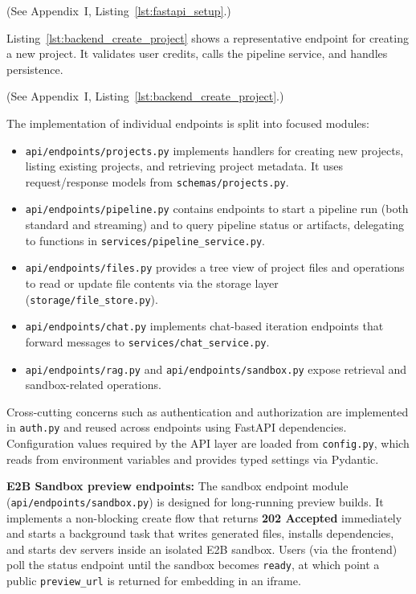 (See Appendix~I, Listing~\ref{lst:fastapi_setup}.)

Listing~\ref{lst:backend_create_project} shows a representative endpoint for creating a new project. It validates user credits, calls the pipeline service, and handles persistence.

(See Appendix~I, Listing~\ref{lst:backend_create_project}.)

The implementation of individual endpoints is split into focused modules:
\begin{itemize}
    \item \texttt{api/\allowbreak{}endpoints/\allowbreak{}projects.py} implements handlers for creating new projects, listing existing projects, and retrieving project metadata. It uses request/response models from \texttt{schemas/\allowbreak{}projects.py}.
    \item \texttt{api/\allowbreak{}endpoints/\allowbreak{}pipeline.py} contains endpoints to start a pipeline run (both standard and streaming) and to query pipeline status or artifacts, delegating to functions in \texttt{services/\allowbreak{}pipeline\_\allowbreak{}service.py}.
    \item \texttt{api/\allowbreak{}endpoints/\allowbreak{}files.py} provides a tree view of project files and operations to read or update file contents via the storage layer (\texttt{storage/\allowbreak{}file\_\allowbreak{}store.py}).
    \item \texttt{api/\allowbreak{}endpoints/\allowbreak{}chat.py} implements chat-based iteration endpoints that forward messages to \texttt{services/\allowbreak{}chat\_\allowbreak{}service.py}.
    \item \texttt{api/\allowbreak{}endpoints/\allowbreak{}rag.py} and \texttt{api/\allowbreak{}endpoints/\allowbreak{}sandbox.py} expose retrieval and sandbox-related operations.
\end{itemize}

Cross-cutting concerns such as authentication and authorization are implemented in \texttt{auth.py} and reused across endpoints using FastAPI dependencies. Configuration values required by the API layer are loaded from \texttt{config.py}, which reads from environment variables and provides typed settings via Pydantic.

\textbf{E2B Sandbox preview endpoints:} The sandbox endpoint module (\texttt{api/\allowbreak{}endpoints/\allowbreak{}sandbox.py}) is designed for long-running preview builds. It implements a non-blocking create flow that returns \textbf{202 Accepted} immediately and starts a background task that writes generated files, installs dependencies, and starts dev servers inside an isolated E2B sandbox. Users (via the frontend) poll the status endpoint until the sandbox becomes \texttt{ready}, at which point a public \texttt{preview\_\allowbreak{}url} is returned for embedding in an iframe.

